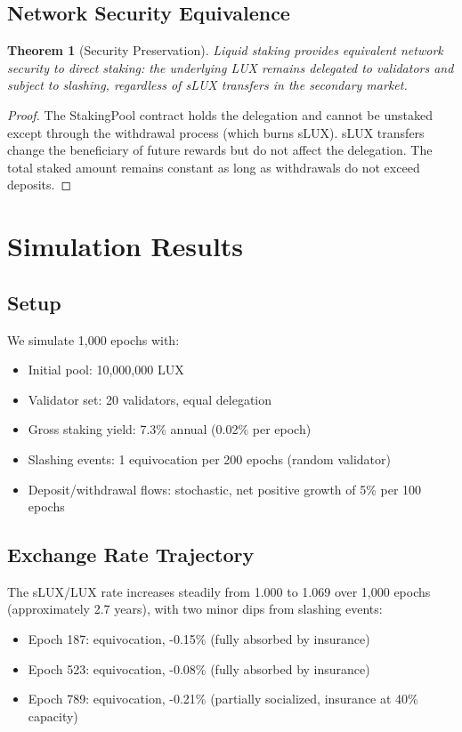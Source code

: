 \documentclass[11pt,a4paper]{article}
\newtheorem{theorem}{Theorem}
\begin{document}
\subsection{Network Security Equivalence}

\begin{theorem}[Security Preservation]
Liquid staking provides equivalent network security to direct staking: the underlying LUX remains delegated to validators and subject to slashing, regardless of sLUX transfers in the secondary market.
\end{theorem}

\begin{proof}
The StakingPool contract holds the delegation and cannot be unstaked except through the withdrawal process (which burns sLUX). sLUX transfers change the beneficiary of future rewards but do not affect the delegation. The total staked amount remains constant as long as withdrawals do not exceed deposits.
\end{proof}

\section{Simulation Results}\label{sec:simulation}

\subsection{Setup}

We simulate 1,000 epochs with:
\begin{itemize}
    \item Initial pool: 10,000,000 LUX
    \item Validator set: 20 validators, equal delegation
    \item Gross staking yield: 7.3\% annual (0.02\% per epoch)
    \item Slashing events: 1 equivocation per 200 epochs (random validator)
    \item Deposit/withdrawal flows: stochastic, net positive growth of 5\% per 100 epochs
\end{itemize}

\subsection{Exchange Rate Trajectory}

The sLUX/LUX rate increases steadily from 1.000 to 1.069 over 1,000 epochs (approximately 2.7 years), with two minor dips from slashing events:
\begin{itemize}
    \item Epoch 187: equivocation, -0.15\% (fully absorbed by insurance)
    \item Epoch 523: equivocation, -0.08\% (fully absorbed by insurance)
    \item Epoch 789: equivocation, -0.21\% (partially socialized, insurance at 40\% capacity)
\end{itemize}
\end{document}
